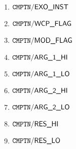 \begin{enumerate}
	\item $\mxpComputationExoInst$
	\item $\mxpComputationWcpFlag$
	\item $\mxpComputationModFlag$
	\item $\mxpComputationArgOneHi$
	\item $\mxpComputationArgOneLo$
	\item $\mxpComputationArgTwoHi$
	\item $\mxpComputationArgTwoLo$
	\item $\mxpComputationResHi$
	\item $\mxpComputationResLo$
\end{enumerate}
